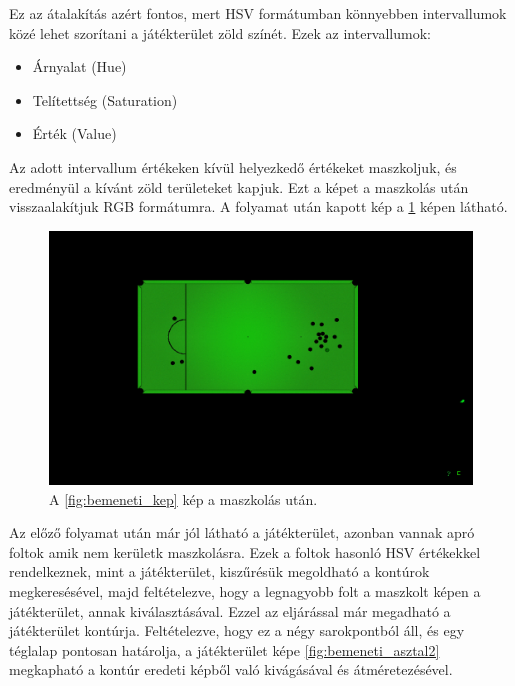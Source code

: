 \par Ez az átalakítás azért fontos, mert HSV formátumban könnyebben intervallumok közé lehet szorítani a játékterület zöld színét.
\newline Ezek az intervallumok:
\begin{itemize}
    \setlength\itemsep{-2pt}
    \item Árnyalat (Hue)
    \item Telítettség (Saturation)
    \item Érték (Value)
\end{itemize}
\par Az adott intervallum értékeken kívül helyezkedő értékeket maszkoljuk, és eredményül a kívánt zöld területeket kapjuk. Ezt a képet a maszkolás után visszaalakítjuk RGB formátumra. A folyamat után kapott kép a \ref{fig:bemeneti_kep_mask} képen látható.

\begin{figure}[!ht]
    \centering
    \includegraphics[width=150mm, keepaspectratio]{figures/input_screen_mask.png}
    \caption{A \ref{fig:bemeneti_kep} kép a maszkolás után.}
    \label{fig:bemeneti_kep_mask}
\end{figure}

\par Az előző folyamat után már jól látható a játékterület, azonban vannak apró foltok amik nem kerületk maszkolásra. Ezek a foltok hasonló HSV értékekkel rendelkeznek, mint a játékterület, kiszűrésük megoldható a kontúrok megkeresésével, majd feltételezve, hogy a legnagyobb folt a maszkolt képen a játékterület, annak kiválasztásával. Ezzel az eljárással már megadható a játékterület kontúrja. Feltételezve, hogy ez a négy sarokpontból áll, és egy téglalap pontosan határolja, a játékterület képe \ref{fig:bemeneti_asztal2} megkapható a kontúr eredeti képből való kivágásával és átméretezésével.

